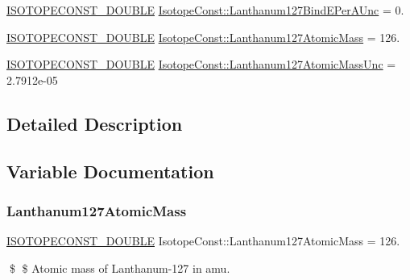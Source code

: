 \begin{DoxyCompactItemize}
\mbox{\hyperlink{group___isotope_const-_macros_ga8f45a7272ce02c0b4c65c44636ed719a}{I\+S\+O\+T\+O\+P\+E\+C\+O\+N\+S\+T\+\_\+\+D\+O\+U\+B\+LE}} \mbox{\hyperlink{group___isotope_const-_lanthanum-_la127_ga65b1f88c03d03fb7fbff34cc0551c950}{Isotope\+Const\+::\+Lanthanum127\+Bind\+E\+Per\+A\+Unc}} = 0.
\item 
\mbox{\hyperlink{group___isotope_const-_macros_ga8f45a7272ce02c0b4c65c44636ed719a}{I\+S\+O\+T\+O\+P\+E\+C\+O\+N\+S\+T\+\_\+\+D\+O\+U\+B\+LE}} \mbox{\hyperlink{group___isotope_const-_lanthanum-_la127_ga8d9b308acf864438acff094c28679dc0}{Isotope\+Const\+::\+Lanthanum127\+Atomic\+Mass}} = 126.
\item 
\mbox{\hyperlink{group___isotope_const-_macros_ga8f45a7272ce02c0b4c65c44636ed719a}{I\+S\+O\+T\+O\+P\+E\+C\+O\+N\+S\+T\+\_\+\+D\+O\+U\+B\+LE}} \mbox{\hyperlink{group___isotope_const-_lanthanum-_la127_gada94af64c3a0933eaef2b60c2c2987ae}{Isotope\+Const\+::\+Lanthanum127\+Atomic\+Mass\+Unc}} = 2.\+7912e-\/05
\end{DoxyCompactItemize}


\subsection{Detailed Description}


\subsection{Variable Documentation}
\mbox{\label{group___isotope_const-_lanthanum-_la127_ga8d9b308acf864438acff094c28679dc0}} 
\subsubsection{\texorpdfstring{Lanthanum127\+Atomic\+Mass}{Lanthanum127AtomicMass}}
{\footnotesize\ttfamily \mbox{\hyperlink{group___isotope_const-_macros_ga8f45a7272ce02c0b4c65c44636ed719a}{I\+S\+O\+T\+O\+P\+E\+C\+O\+N\+S\+T\+\_\+\+D\+O\+U\+B\+LE}} Isotope\+Const\+::\+Lanthanum127\+Atomic\+Mass = 126.}

\$ \$ Atomic mass of Lanthanum-\/127 in amu. \mbox{\label{group___isotope_const-_lanthanum-_la127_gada94af64c3a0933eaef2b60c2c2987ae}} 
